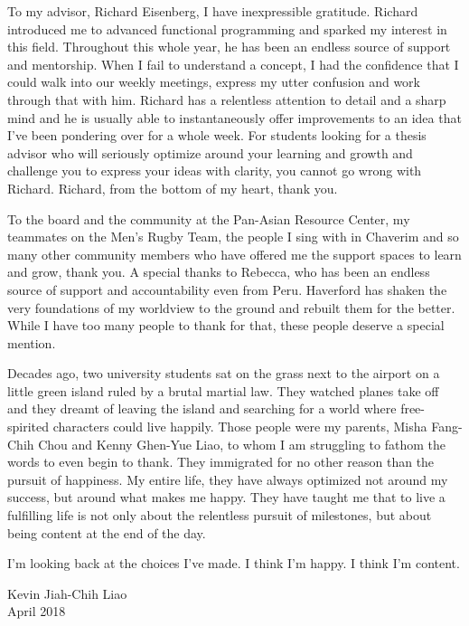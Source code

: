 \begin{acknowledgements}
To my advisor, Richard Eisenberg, I have inexpressible gratitude. Richard
introduced me to advanced functional programming and sparked my interest in this
field. Throughout this whole year, he has been an endless source of support and
mentorship. When I fail to understand a concept, I had the confidence that I
could walk into our weekly meetings, express my utter confusion and work through
that with him. Richard has a relentless attention to detail and a sharp mind and
he is usually able to instantaneously offer improvements to an idea that I've
been pondering over for a whole week. For students looking for a thesis advisor
who will seriously optimize around your learning and growth and challenge you to
express your ideas with clarity, you cannot go wrong with Richard. Richard, from
the bottom of my heart, thank you. 

To the board and the community at the Pan-Asian Resource Center, my teammates on
the Men's Rugby Team, the people I sing with in Chaverim and so many other
community members who have offered me the support spaces to learn and grow,
thank you. A special thanks to Rebecca, who has been an endless source of
support and accountability even from Peru. Haverford has shaken the very
foundations of my worldview to the ground and rebuilt them for the better. While
I have too many people to thank for that, these people deserve a special
mention. 

Decades ago, two university students sat on the grass next to the airport on a
little green island ruled by a brutal martial law. They watched planes take off
and they dreamt of leaving the island and searching for a world where
free-spirited characters could live happily. Those people were my parents, Misha
Fang-Chih Chou and Kenny Ghen-Yue Liao, to whom I am struggling to fathom the
words to even begin to thank. They immigrated for no other reason than the
pursuit of happiness. My entire life, they have always optimized not around my
success, but around what makes me happy. They have taught me that to live a
fulfilling life is not only about the relentless pursuit of milestones, but
about being content at the end of the day. 

I'm looking back at the choices I've made. I think I'm happy. I think I'm
content. 

Kevin Jiah-Chih Liao\\
April 2018

\end{acknowledgements}
